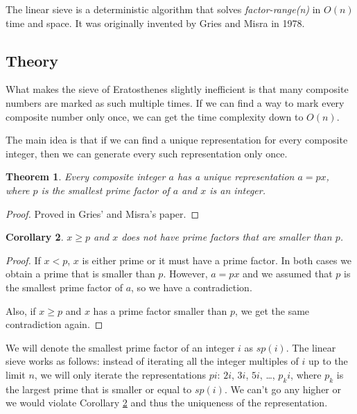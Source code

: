\documentclass[12pt] {article}
\theoremstyle{plain}
\newtheorem{thm}{Theorem}[section]
\newtheorem{cor}[thm]{Corollary}
\theoremstyle{definition}
\begin{document}
The linear sieve is a deterministic algorithm that solves \textit{factor-range(n)} in $O(n)$ time and space. It was originally invented by Gries and Misra in 1978\cite{gries}.

\subsection {Theory}

What makes the sieve of Eratosthenes slightly inefficient is that many composite numbers are marked as such multiple times. If we can find a way to mark every composite number only once, we can get the time complexity down to $O(n)$.

The main idea is that if we can find a unique representation for every composite integer, then we can generate every such representation only once.

\begin{thm}
\label {thm:comprepr}
Every composite integer $a$ has a unique representation $a = px$, where $p$ is the smallest prime factor of $a$ and $x$ is an integer.
\end{thm}

\begin{proof}
Proved in Gries' and Misra's paper\cite{gries}.
\end{proof}

\begin{cor}
\label {cor:pflimit}
$x \geq p$ and $x$ does not have prime factors that are smaller than $p$.
\end{cor}

\begin{proof}
If $x < p$, $x$ is either prime or it must have a prime factor. In both cases we obtain a prime that is smaller than $p$. However, $a = px$ and we assumed that $p$ is the smallest prime factor of $a$, so we have a contradiction.

Also, if $x \geq p$ and $x$ has a prime factor smaller than $p$, we get the same contradiction again.
\end{proof}

We will denote the smallest prime factor of an integer $i$ as $sp(i)$. The linear sieve works as follows: instead of iterating all the integer multiples of $i$ up to the limit $n$, we will only iterate the representations $pi$: $2i$, $3i$, $5i$, \dots , $p_ki$, where $p_k$ is the largest prime that is smaller or equal to $sp(i)$. We can't go any higher or we would violate Corollary \ref{cor:pflimit} and thus the uniqueness of the representation. 
\end{document}
